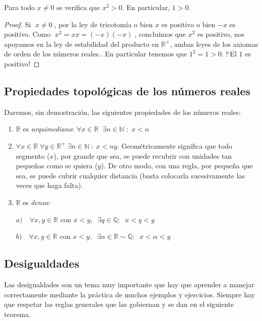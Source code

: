 	
		\begin{prop}
		Para todo $x\neq 0$ se verifica que $x^2>0$. En particular, $1>0$.
		\end{prop}
	
		\begin{proof}
		Si $\;x\neq 0 \;$, por la ley de tricotomía o bien $x$ es positivo o bien $-x$ es positivo. Como $\; x^2=xx=(-x)(-x)\; $, concluimos que $x^2$ es positivo, nos apoyamos en la ley de estabilidad del producto en $\mathbb R^+$, ambas leyes de los axiomas de orden de los números reales.. En particular tenemos que $1^2=1>0$. !`El $1$ es positivo! 
		\end{proof}
		
		
	\subsection{Propiedades topológicas de los números reales}
	 
	 Daremos, sin demostración, las siguientes propiedades de los números reales:
	 
	
	\begin{enumerate}[Prop.R.1]
	
		\item $\mathbb R$ es \emph{arquimediano}: $\forall x \in \mathbb R \; \; \exists n \in \mathbb N \; : \; x<n$
		\item $\forall x \in \mathbb R \; \forall y \in \mathbb R^{+} \;  \exists n \in \mathbb N \: : \; x<ny $. Geométricamente significa que todo segmento ($x$), por grande que sea, se puede recubrir con unidades tan pequeñas como se quiera ($y$). De otro modo, con una regla, por pequeña que sea, se puede cubrir cualquier distancia (basta colocarla sucesivamente las veces que haga falta).
		\item $\mathbb R\; $es \emph{denso}: 
		
		$a)\quad \forall x,y \in \mathbb R$ con $x<y,\;\; \exists q \in \mathbb Q:\; \; x<q<y$
		
		$b)\quad \forall x,y \in \mathbb R$ con $x<y,\;\; \exists \alpha  \in \mathbb R \sim \mathbb Q: \; \; x<\alpha<y$
		
		 
	\end{enumerate}
	
	\subsection{Desigualdades}
	 Las desigualdades son un tema muy importante que hay que aprender a manejar correctamente mediante la práctica de muchos ejemplos y ejercicios. Siempre hay que respetar las reglas generales que las gobiernan y se dan en el siguiente teorema.	
			
